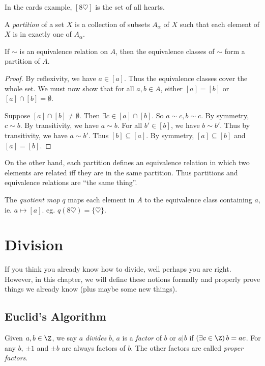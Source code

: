 \documentclass[a4paper]{article}
\begin{document}
\begin{eg}
  In the cards example, $[8\heartsuit]$ is the set of all hearts.
\end{eg}

\begin{defi}
  A \emph{partition} of a set $X$ is a collection of subsets $A_\alpha$ of $X$ such that each element of $X$ is in exactly one of $A_\alpha$.
\end{defi}

\begin{thm}
  If $\sim$ is an equivalence relation on $A$, then the equivalence classes of $\sim$ form a partition of $A$.
\end{thm}

\begin{proof}
  By reflexivity, we have $a\in [a]$. Thus the equivalence classes cover the whole set. We must now show that for all $a, b\in A$, either $[a] = [b]$ or $[a]\cap [b]=\emptyset$.

  Suppose $[a]\cap[b]\not=\emptyset$. Then $\exists c\in [a]\cap[b]$. So $a\sim c, b\sim c$. By symmetry, $c\sim b$. By transitivity, we have $a\sim b$. For all $b'\in [b]$, we have $b\sim b'$. Thus by transitivity, we have $a\sim b'$. Thus $[b]\subseteq[a]$. By symmetry, $[a]\subseteq[b]$  and $[a] = [b]$.
\end{proof}

On the other hand, each partition defines an equivalence relation in which two elements are related iff they are in the same partition. Thus partitions and equivalence relations are ``the same thing''.
\begin{defi}
  The \emph{quotient map} $q$ maps each element in $A$ to the equivalence class containing $a$, ie. $a\mapsto [a]$. eg. $q(8\heartsuit) = \{\heartsuit\}$.
\end{defi}

\section{Division}
If you think you already know how to divide, well perhaps you are right. However, in this chapter, we will define these notions formally and properly prove things we already know (plus maybe some new things).
\subsection{Euclid's Algorithm}
\begin{defi}
  Given $a, b\in \Z$, we say $a$ \emph{divides} $b$, $a$ is a \emph{factor} of $b$ or $a|b$ if $(\exists c\in \Z)\,b = ac$. For any $b$, $\pm 1$ and $\pm b$ are always factors of $b$. The other factors are called \emph{proper factors}.
\end{defi}
\end{document}
